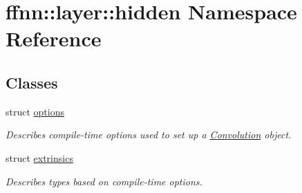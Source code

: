 \hypertarget{namespaceffnn_1_1layer_1_1hidden}{\section{ffnn\-:\-:layer\-:\-:hidden Namespace Reference}
\label{namespaceffnn_1_1layer_1_1hidden}
}
\subsection*{Classes}
\begin{DoxyCompactItemize}
\item 
struct \hyperlink{structffnn_1_1layer_1_1hidden_1_1options}{options}
\begin{DoxyCompactList}\small\item\em Describes compile-\/time options used to set up a \hyperlink{classffnn_1_1layer_1_1_convolution}{Convolution} object. \end{DoxyCompactList}\item 
struct \hyperlink{structffnn_1_1layer_1_1hidden_1_1extrinsics}{extrinsics}
\begin{DoxyCompactList}\small\item\em Describes types based on compile-\/time options. \end{DoxyCompactList}\end{DoxyCompactItemize}
